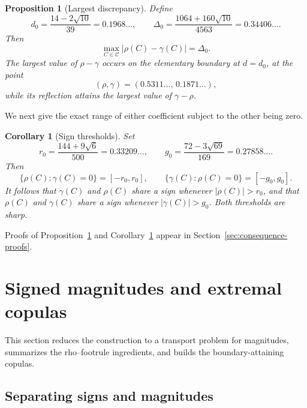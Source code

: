 \documentclass{article}
\newtheorem{proposition}[theorem]{Proposition}
\newtheorem{corollary}[theorem]{Corollary}
\theoremstyle{definition}
\theoremstyle{remark}
\newcommand{\1}{\mathds{1}}
\newcommand{\CC}{\mathcal{C}}
\begin{document}
\begin{proposition}[Largest discrepancy]\label{prop:discrepancy}
Define
\begin{equation}\label{eq:discrepancy-constant}
d_0=\frac{14-2\sqrt{10}}{39}=0.1968\dots,
\qquad
\Delta_0
=
\frac{1064+160\sqrt{10}}{4563}
=
0.34406\ldots.
\end{equation}
Then
\begin{equation}\label{eq:discrepancy}
\max_{C\in\CC}|\rho(C)-\gamma(C)|=\Delta_0.
\end{equation}
The largest value of $\rho-\gamma$ occurs on the elementary boundary at
$d=d_0$, at the point
\[
(\rho,\gamma)
=
(0.5311\ldots,\,0.1871\ldots),
\]
while its reflection attains the largest value of $\gamma-\rho$.
\end{proposition}

We next give the exact range of either coefficient subject to the other
being zero.

\begin{corollary}[Sign thresholds]\label{cor:signs}
Set
\begin{equation}\label{eq:thresholds}
r_0=\frac{144+9\sqrt6}{500}=0.33209\ldots,
\qquad
g_0=\frac{72-3\sqrt{69}}{169}=0.27858\ldots.
\end{equation}
Then
\begin{equation}\label{eq:zero-sections}
\{\rho(C):\gamma(C)=0\}=[-r_0,r_0],
\qquad
\{\gamma(C):\rho(C)=0\}=[-g_0,g_0].
\end{equation}
It follows that $\gamma(C)$ and $\rho(C)$ share a sign whenever
$|\rho(C)|>r_0$, and that $\rho(C)$ and $\gamma(C)$ share a sign whenever
$|\gamma(C)|>g_0$. Both thresholds are sharp.
\end{corollary}

Proofs of Proposition~\ref{prop:discrepancy} and
Corollary~\ref{cor:signs} appear in
Section~\ref{sec:consequence-proofs}.
\section{Signed magnitudes and extremal copulas}\label{sec:construction}

This section reduces the construction to a transport problem for magnitudes,
summarizes the rho--footrule ingredients, and builds the boundary-attaining copulas.

\subsection{Separating signs and magnitudes}\label{sec:signs}
\end{document}
